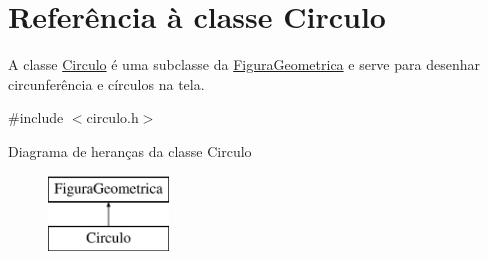 \hypertarget{class_circulo}{}\section{Referência à classe Circulo}
\label{class_circulo}


A classe \mbox{\hyperlink{class_circulo}{Circulo}} é uma subclasse da \mbox{\hyperlink{class_figura_geometrica}{Figura\+Geometrica}} e serve para desenhar circunferência e círculos na tela.  




{\ttfamily \#include $<$circulo.\+h$>$}

Diagrama de heranças da classe Circulo\begin{figure}[H]
\begin{center}
\leavevmode
\includegraphics[height=2.000000cm]{class_circulo}
\end{center}
\end{figure}
